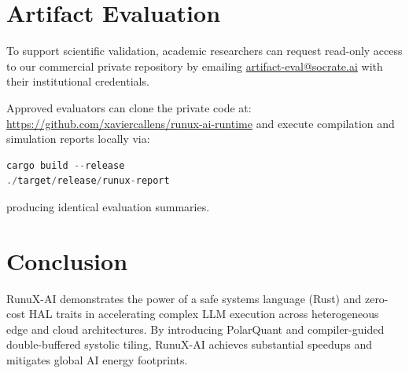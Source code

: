 \documentclass[sigconf,nonacm=false]{acmart}
\begin{document}

\section{Artifact Evaluation}
\label{sec:reproducibility}

To support scientific validation, academic researchers can request read-only access to our commercial private repository by emailing \url{artifact-eval@socrate.ai} with their institutional credentials. 

Approved evaluators can clone the private code at:  
\url{https://github.com/xaviercallens/runux-ai-runtime}  
and execute compilation and simulation reports locally via:
\begin{lstlisting}[language=C,caption={Executing RunuX-AI Simulation Benchmarks.},label=lst:repro]
cargo build --release
./target/release/runux-report
\end{lstlisting}
producing identical evaluation summaries.

\section{Conclusion}
\label{sec:conclusion}

RunuX-AI demonstrates the power of a safe systems language (Rust) and zero-cost HAL traits in accelerating complex LLM execution across heterogeneous edge and cloud architectures. By introducing PolarQuant and compiler-guided double-buffered systolic tiling, RunuX-AI achieves substantial speedups and mitigates global AI energy footprints.
\end{document}
